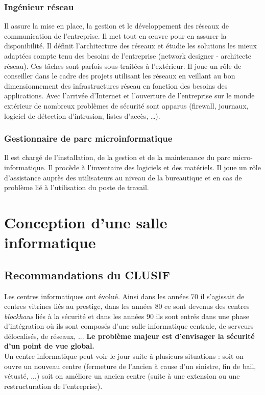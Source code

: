 \documentclass[10pt,a4paper,oneside,titlepage]{report}
\newcommand{\titre}[1]{\textcolor{title}{#1}}
\newcommand{\newterm}[1]{\textit{#1}}
\newcommand{\strong}[1]{\textbf{\titre{#1}}}
\begin{document}
\subsubsection{Ingénieur réseau}
Il assure la mise en place, la gestion et le développement des réseaux de
communication de l’entreprise. Il met tout en œuvre pour en assurer la
disponibilité. Il définit l’architecture des réseaux et étudie les solutions les
mieux adaptées compte tenu des besoins de l’entreprise (network designer -
architecte réseau). Ces tâches sont parfois sous-traitées à l’extérieur.
Il joue un rôle de conseiller dans le cadre des projets utilisant les réseaux en
veillant au bon dimensionnement des infrastructures réseau en fonction des
besoins des applications. Avec l’arrivée d’Internet et l’ouverture de
l’entreprise sur le monde extérieur de nombreux problèmes de sécurité sont
apparus (firewall, journaux, logiciel de détection d’intrusion, listes d’accès,
\dots).

\subsubsection{Gestionnaire de parc microinformatique}
Il est chargé de l’installation, de la gestion et de la maintenance du parc
micro-informatique. Il procède à l’inventaire des logiciels et des matériels.
Il joue un rôle d’assistance auprès des utilisateurs au niveau de la bureautique
et en cas de problème lié à l’utilisation du poste de travail.

\section{Conception d'une salle informatique}

\subsection{Recommandations du CLUSIF}

Les centres informatiques ont évolué. Ainsi dans les années 70 il s'agissait de centres vitrines liés au prestige, dans les années 80 ce sont devenus des centres
\newterm{blockhaus} liés à la sécurité et dans les années 90 ils sont entrés dans une phase d'intégration où ils sont composés d'une salle informatique centrale, de
serveurs délocalisés, de réseaux, ... \strong{Le problème majeur est d'envisager la sécurité d'un point de vue global.} \\

Un centre informatique peut voir le jour suite à plusieurs situations : soit on ouvre un nouveau centre (fermeture de l'ancien à cause d'un sinistre, fin de bail, vétusté,
...) soit on améliore un ancien centre (suite à une extension ou une restructuration de l'entreprise). \\
\end{document}

